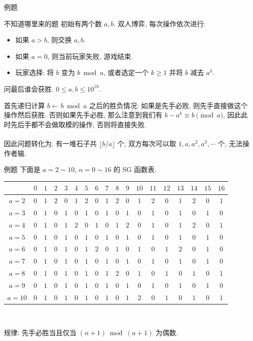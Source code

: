 \documentclass{beamer}
\newcommand{\nl}{\\\hspace*{\fill}\\}
\begin{document}
	\begin{frame}{例题}
		\begin{block}{不知道哪里来的题}
			初始有两个数 $a,b$. 双人博弈, 每次操作依次进行:
			\begin{itemize}
				\item 如果 $a>b$, 则交换 $a,b$.
				\item 如果 $a=0$, 则当前玩家失败, 游戏结束.
				\item 玩家选择: 将 $b$ 变为 $b\bmod a$, 或者选定一个 $k\geq 1$ 并将 $b$ 减去 $a^k$.
			\end{itemize}
			问最后谁会获胜. $0\leq a,b\leq 10^{18}$.
		\end{block}
		\pause
		首先递归计算 $b\gets b\bmod a$ 之后的胜负情况: 如果是先手必败, 则先手直接做这个操作然后获胜. 否则如果先手必胜, 那么注意到我们有 $b-a^k\equiv b\pmod a$, 因此此时先后手都不会做取模的操作, 否则将直接失败.\nl
		因此问题转化为, 有一堆石子共 $\lfloor b/a\rfloor$ 个, 双方每次可以取 $1,a,a^2,a^3,\cdots$ 个, 无法操作者输.
	\end{frame}
	
	\begin{frame}{例题}
		下面是 $a=2\sim 10$, $n=0\sim 16$ 的 SG 函数表.\\
		\begin{center}
			\begin{tabular}{c|ccccccccccccccccc}
				\toprule
				      & $0$ & $1$ & $2$ & $3$ & $4$ & $5$ & $6$ & $7$ & $8$ & $9$ & $10$ & $11$ & $12$ & $13$ & $14$ & $15$ & $16$\\
				\hline
				$a=2$ & $0$ & $1$ & $2$ & $0$ & $1$ & $2$ & $0$ & $1$ & $2$ & $0$ &  $1$ &  $2$ &  $0$ &  $1$ &  $2$ &  $0$ &  $1$\\
				$a=3$ & $0$ & $1$ & $0$ & $1$ & $0$ & $1$ & $0$ & $1$ & $0$ & $1$ &  $0$ &  $1$ &  $0$ &  $1$ &  $0$ &  $1$ &  $0$\\
				$a=4$ & $0$ & $1$ & $0$ & $1$ & $2$ & $0$ & $1$ & $0$ & $1$ & $2$ &  $0$ &  $1$ &  $0$ &  $1$ &  $2$ &  $0$ &  $1$\\
				$a=5$ & $0$ & $1$ & $0$ & $1$ & $0$ & $1$ & $0$ & $1$ & $0$ & $1$ &  $0$ &  $1$ &  $0$ &  $1$ &  $0$ &  $1$ &  $0$\\
				$a=6$ & $0$ & $1$ & $0$ & $1$ & $0$ & $1$ & $2$ & $0$ & $1$ & $0$ &  $1$ &  $0$ &  $1$ &  $2$ &  $0$ &  $1$ &  $0$\\
				$a=7$ & $0$ & $1$ & $0$ & $1$ & $0$ & $1$ & $0$ & $1$ & $0$ & $1$ &  $0$ &  $1$ &  $0$ &  $1$ &  $0$ &  $1$ &  $0$\\
				$a=8$ & $0$ & $1$ & $0$ & $1$ & $0$ & $1$ & $0$ & $1$ & $2$ & $0$ &  $1$ &  $0$ &  $1$ &  $0$ &  $1$ &  $0$ &  $1$\\
				$a=9$ & $0$ & $1$ & $0$ & $1$ & $0$ & $1$ & $0$ & $1$ & $0$ & $1$ &  $0$ &  $1$ &  $0$ &  $1$ &  $0$ &  $1$ &  $0$\\
				$a=10$& $0$ & $1$ & $0$ & $1$ & $0$ & $1$ & $0$ & $1$ & $0$ & $1$ &  $2$ &  $0$ &  $1$ &  $0$ &  $1$ &  $0$ &  $1$\\
				\bottomrule
			\end{tabular}\\
		\end{center}
		\pause
		规律: 先手必胜当且仅当 $(n+1)\bmod (a+1)$ 为偶数.
	\end{frame}
\end{document}
